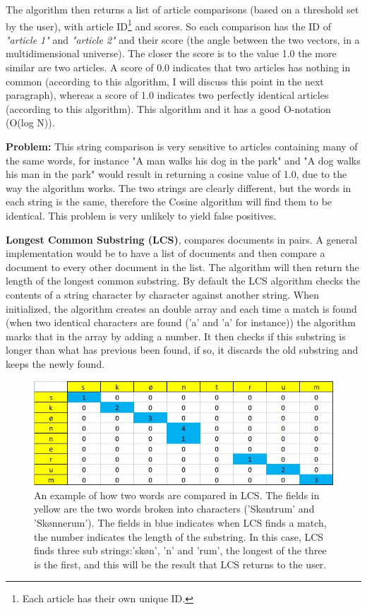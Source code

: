 The algorithm then returns a list of article comparisons (based on a threshold set by the user), with article ID\footnote{Each article has their own unique ID.} and scores. So each comparison has the ID of \textit{"article 1"} and \textit{"article 2"} and their score (the angle between the two vectors, in a multidimensional universe). The closer the score is to the value 1.0 the more similar are two articles. A score of 0.0 indicates that two articles has nothing in common (according to this algorithm, I will discuss this point in the next paragraph), whereas a score of 1.0 indicates two perfectly identical articles (according to this algorithm). This algorithm and it has a good O-notation (O(log N)).

\textbf{Problem:} This string comparison is very sensitive to articles containing many of the same words, for instance "A man walks his dog in the park" and "A dog walks his man in the park" would result in returning a cosine value of 1.0, due to the way the algorithm works. The two strings are clearly different, but the words in each string is the same, therefore the Cosine algorithm will find them to be identical. This problem is very unlikely to yield false positives.

\textbf{Longest Common Substring (LCS)}, compares documents in pairs. A general implementation would be to have a list of documents and then compare a document to every other document in the list. The algorithm will then return the length of the longest common substring. By default the LCS algorithm\cite{WikiLCS} checks the contents of a string character by character against another string. When initialized, the algorithm creates an double array and each time a match is found (when two identical characters are found ('a' and 'a' for instance)) the algorithm marks that in the array by adding a number. It then checks if this substring is longer than what has previous been found, if so, it discards the old substring and keeps the newly found.

\begin{figure}[h]
	\centering
	\includegraphics[scale=0.75]{figures/LcsExplained}
	\caption{An example of how two words are compared in LCS. The fields in yellow are the two words broken into characters ('Skøntrum' and 'Skønnerum'). The fields in blue indicates when LCS finds a match, the number indicates the length of the substring. In this case, LCS finds three sub strings:'skøn', 'n' and 'rum', the longest of the three is the first, and this will be the result that LCS returns to the user. }
	\label{LcsExplained}
\end{figure}

